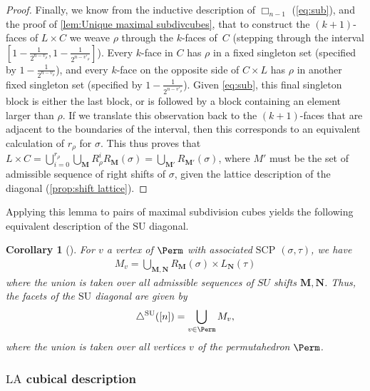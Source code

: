 \documentclass{amsart}
\newtheorem{corollary}[theorem]{Corollary}
\theoremstyle{definition}
\newcommand{\SU}{\mathrm{SU}}
\newcommand{\LA}{\mathrm{LA}}
\newcommand{\SUD}{\triangle^{\mathrm{SU}}}
\newcommand{\SCP}{\mathrm{SCP}}
\newcommand{\divcube}[1]{\Box_{#1}}
\newcommand{\maxsubdivpairsv}{M_v}
\begin{document}
\begin{proof}
Finally, we know from the inductive description of $\divcube{n-1}$ (\cref{eq:sub}), and the proof of \cref{lem:Unique maximal subdivcubes}, that to construct the $(k+1)$-faces of $L\times C$ we weave $\rho$ through the $k$-faces of~$C$ (stepping through the interval $[1-\frac{1}{2^{n-v_\rho}},1-\frac{1}{2^{n-v'_\rho}}]$).
Every $k$-face in $C$ has $\rho$ in a fixed singleton set (specified by $1-\frac{1}{2^{n-v_\rho}}$), and every $k$-face on the opposite side of $C\times L$ has $\rho$ in another fixed singleton set (specified by $1-\frac{1}{2^{n-v'_\rho}}$).
Given \cref{eq:sub}, this final singleton block is either the last block, or is followed by a block containing an element larger than $\rho$.
If we translate this observation back to the $(k+1)$-faces that are adjacent to the boundaries of the interval, then this corresponds to an equivalent calculation of $r_\rho$ for $\sigma$.
This thus proves that~${L\times C = \bigcup_{i=0}^{r_\rho}\bigcup_{\mathbf{M}}R^i_\rho R_\mathbf{M}(\sigma) = \bigcup_{\mathbf{M'}}R_\mathbf{M'}(\sigma)}$, where $M'$ must be the set of admissible sequence of right shifts of $\sigma$, given the lattice description of the diagonal (\cref{prop:shift lattice}).
\end{proof}

Applying this lemma to pairs of maximal subdivision cubes yields the following equivalent description of the $\SU$ diagonal.

\begin{corollary}[{\cite[Form.~(1)~\&~(3)]{SaneblidzeUmble-comparingDiagonals}}]
\label{prop:SU-cubical}
For $v$ a vertex of $\Perm$ with associated $\SCP$ $(\sigma,\tau)$, we have
\begin{align*}
\maxsubdivpairsv = \bigcup_{\mathbf{M},\mathbf{N}} R_\mathbf{M}(\sigma) \times L_{\mathbf{N}}(\tau)
\end{align*}
where the union is taken over all admissible sequences of $SU$ shifts $\mathbf{M},\mathbf{N}$.
Thus, the facets of the $\SU$ diagonal are given by
\begin{align*}
\SUD([n]) = \bigcup_{v \in \Perm} \maxsubdivpairsv,
\end{align*}
where the union is taken over all vertices $v$ of the permutahedron $\Perm$. 
\end{corollary}

\subsubsection{$\LA$ cubical description}
\end{document}
